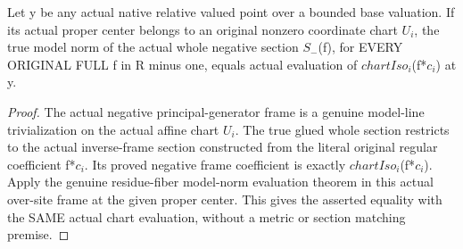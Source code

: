 \begin{theorem}
\label{thm:seven-native-original-negative-local-norm}
\leanok
Let y be any actual native relative valued point over a bounded base
valuation. If its actual proper center belongs to an original nonzero
coordinate chart $U_i$, the true model norm of the actual whole negative
section $S_-$(f), for EVERY ORIGINAL FULL f in R minus one, equals actual
evaluation of $chartIso_i$(f*$c_i$) at y.
\end{theorem}
\begin{proof}
The actual negative principal-generator frame is a genuine model-line
trivialization on the actual affine chart $U_i$. The true glued whole
section restricts to the actual inverse-frame section constructed from
the literal original regular coefficient f*$c_i$. Its proved negative
frame coefficient is exactly $chartIso_i$(f*$c_i$). Apply the genuine
residue-fiber model-norm evaluation theorem in this actual over-site
frame at the given proper center. This gives the asserted equality
with the SAME actual chart evaluation, without a metric or section
matching premise.
\end{proof}

